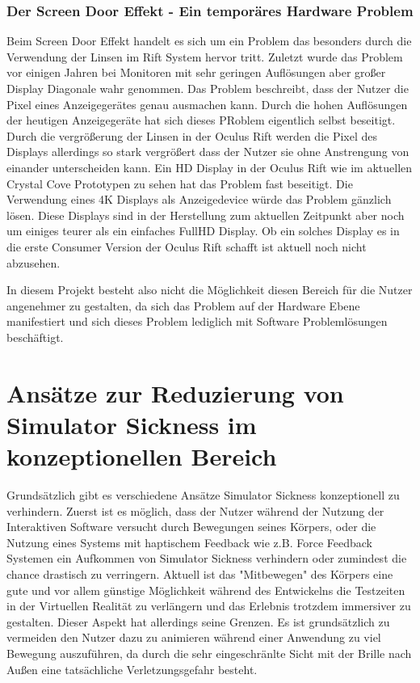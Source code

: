 \documentclass[pagesize, paper=a4, fontsize=12pt,titlepage=true, headings=small, headnosepline, abstractoff, liststotoc, nochapterprefix, plainheadsepline]{scrreprt}
\begin{document}
\subsubsection{Der Screen Door Effekt - Ein temporäres Hardware Problem}
Beim Screen Door Effekt handelt es sich um ein Problem das besonders durch die Verwendung der Linsen im Rift System hervor tritt. Zuletzt wurde das Problem vor einigen Jahren bei Monitoren mit sehr geringen Auflösungen aber großer Display Diagonale wahr genommen. Das Problem beschreibt, dass der Nutzer die Pixel eines Anzeigegerätes genau ausmachen kann. Durch die hohen Auflösungen der heutigen Anzeigegeräte hat sich dieses PRoblem eigentlich selbst beseitigt. Durch die vergrößerung der Linsen in der Oculus Rift werden die Pixel des Displays allerdings so stark vergrößert dass der Nutzer sie ohne Anstrengung von einander unterscheiden kann. Ein HD Display in der Oculus Rift wie im aktuellen Crystal Cove Prototypen zu sehen hat das Problem fast beseitigt. Die Verwendung eines 4K Displays als Anzeigedevice würde das Problem gänzlich lösen. Diese Displays sind in der Herstellung zum aktuellen Zeitpunkt aber noch um einiges teurer als ein einfaches FullHD Display. Ob ein solches Display es in die erste Consumer Version der Oculus Rift schafft ist aktuell noch nicht abzusehen.

In diesem Projekt besteht also nicht die Möglichkeit diesen Bereich für die Nutzer angenehmer zu gestalten, da sich das Problem auf der Hardware Ebene manifestiert und sich dieses Problem lediglich mit Software Problemlösungen beschäftigt.

\section{Ansätze zur Reduzierung von Simulator Sickness im konzeptionellen Bereich}
Grundsätzlich gibt es verschiedene Ansätze Simulator Sickness konzeptionell zu verhindern. Zuerst ist es möglich, dass der Nutzer während der Nutzung der Interaktiven Software versucht durch Bewegungen seines Körpers, oder die Nutzung eines Systems mit haptischem Feedback wie z.B. Force Feedback Systemen ein Aufkommen von Simulator Sickness verhindern oder zumindest die chance drastisch zu verringern. Aktuell ist das "Mitbewegen" des Körpers eine gute und vor allem günstige Möglichkeit während des Entwickelns die Testzeiten in der Virtuellen Realität zu verlängern und das Erlebnis trotzdem immersiver zu gestalten. Dieser Aspekt hat allerdings seine Grenzen. Es ist grundsätzlich zu vermeiden den Nutzer dazu zu animieren während einer Anwendung zu viel Bewegung auszuführen, da durch die sehr eingeschränlte Sicht mit der Brille nach Außen eine tatsächliche Verletzungsgefahr besteht.
\end{document}
